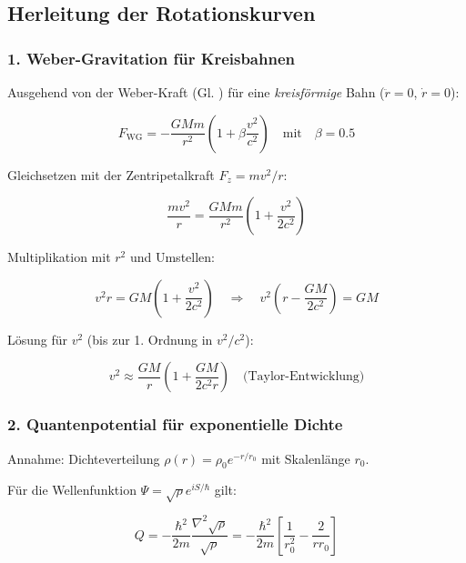 \subsection{Herleitung der Rotationskurven}

\subsubsection{1. Weber-Gravitation für Kreisbahnen}
Ausgehend von der Weber-Kraft (Gl. ) für eine \textit{kreisförmige} Bahn ($\ddot{r} = 0$, $\dot{r} = 0$):

\begin{equation}
F_{\text{WG}} = -\frac{GMm}{r^2}\left(1 + \beta\frac{v^2}{c^2}\right) \quad \text{mit} \quad \beta = 0.5
\end{equation}

Gleichsetzen mit der Zentripetalkraft $F_z = mv^2/r$:

\begin{equation}
\frac{mv^2}{r} = \frac{GMm}{r^2}\left(1 + \frac{v^2}{2c^2}\right)
\end{equation}

Multiplikation mit $r^2$ und Umstellen:

\begin{equation}
v^2r = GM\left(1 + \frac{v^2}{2c^2}\right) \quad \Rightarrow \quad v^2\left(r - \frac{GM}{2c^2}\right) = GM
\end{equation}

Lösung für $v^2$ (bis zur 1. Ordnung in $v^2/c^2$):

\begin{equation}
v^2 \approx \frac{GM}{r}\left(1 + \frac{GM}{2c^2r}\right) \quad \text{(Taylor-Entwicklung)}
\end{equation}

\subsubsection{2. Quantenpotential für exponentielle Dichte}
Annahme: Dichteverteilung $\rho(r) = \rho_0 e^{-r/r_0}$ mit Skalenlänge $r_0$.

Für die Wellenfunktion $\Psi = \sqrt{\rho} e^{iS/\hbar}$ gilt:

\begin{equation}
Q = -\frac{\hbar^2}{2m}\frac{\nabla^2\sqrt{\rho}}{\sqrt{\rho}} = -\frac{\hbar^2}{2m}\left[\frac{1}{r_0^2} - \frac{2}{rr_0}\right]
\end{equation}

